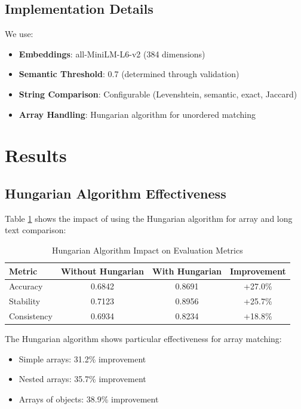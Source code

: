\documentclass[letterpaper]{article} %
\begin{document}
\subsection{Implementation Details}

We use:
\begin{itemize}
\item \textbf{Embeddings}: all-MiniLM-L6-v2 (384 dimensions)
\item \textbf{Semantic Threshold}: 0.7 (determined through validation)
\item \textbf{String Comparison}: Configurable (Levenshtein, semantic, exact, Jaccard)
\item \textbf{Array Handling}: Hungarian algorithm for unordered matching
\end{itemize}

\section{Results}

\subsection{Hungarian Algorithm Effectiveness}

Table \ref{tab:hungarian} shows the impact of using the Hungarian algorithm for array and long text comparison:

\begin{table}[h]
\centering
\caption{Hungarian Algorithm Impact on Evaluation Metrics}
\label{tab:hungarian}
\begin{tabular}{lccc}
\toprule
Metric & Without Hungarian & With Hungarian & Improvement \\
\midrule
Accuracy & 0.6842 & 0.8691 & +27.0\% \\
Stability & 0.7123 & 0.8956 & +25.7\% \\
Consistency & 0.6934 & 0.8234 & +18.8\% \\
\bottomrule
\end{tabular}
\end{table}

The Hungarian algorithm shows particular effectiveness for array matching:
\begin{itemize}
\item Simple arrays: 31.2\% improvement
\item Nested arrays: 35.7\% improvement
\item Arrays of objects: 38.9\% improvement
\end{itemize}
\end{document}
